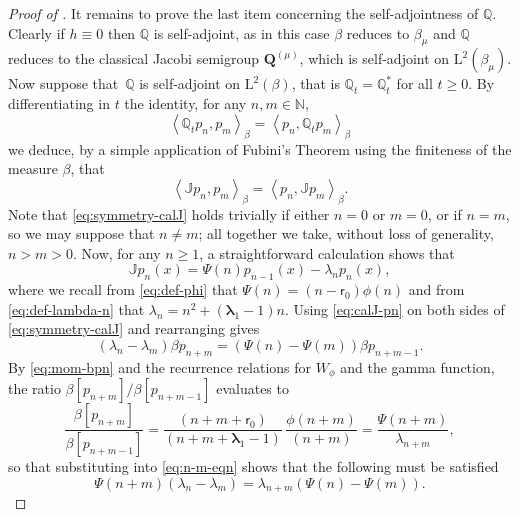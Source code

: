 \documentclass[10pt]{amsart}
\theoremstyle{plain}
\theoremstyle{definition}
\newcommand{\N}{\mathbb{N}}
\newcommand{\J}{\mathds{Q}}
\newcommand{\calJ}{\mathds{J}}
\newcommand{\Leb}{\mathrm{L}}
\newcommand{\lam}{{\bm{\lambda}_1}}
\newcommand{\tet}{{\mathsf{r}_0}}
\newcommand{\Q}[1][\mo]{\mathbf{Q}^{({#1})}}
\newcommand{\gab}[1][\lam,\mo]{{\beta_{#1}}}
\let\mo\mu
\let\bpsi\beta
\begin{document}
\begin{proof}[Proof of ]
It remains to prove the last item concerning the self-adjointness of $\J$. Clearly if $h \equiv 0$ then $\J$ is self-adjoint, as in this case $\bpsi$ reduces to $\gab[\mo]$ and $\J$ reduces to the classical Jacobi semigroup $\Q[\mo]$, which is self-adjoint on $\Leb^2(\gab[\mo])$. Now suppose that~$\J$ is self-adjoint on $\Leb^2(\bpsi)$, that is $\J_t = \J_t^*$ for all $t \geq 0$. By differentiating in $t$ the identity, for any $n, m \in \N$,
\begin{equation*}
\left\langle \J_t p_n, p_m \right\rangle_{\bpsi} = \left\langle p_n, \J_t p_m \right\rangle_{\bpsi}
\end{equation*}
we deduce, by a simple application of Fubini's Theorem using the finiteness of the measure $\bpsi$, that
\begin{equation}
\label{eq:symmetry-calJ}
\left\langle \calJ p_n, p_m \right\rangle_{\bpsi} = \left\langle p_n, \calJ p_m \right\rangle_{\bpsi}.
\end{equation}
Note that \eqref{eq:symmetry-calJ} holds trivially if either $n=0$ or $m=0$, or if $n=m$, so we may suppose that $n \neq m$; all together we take, without loss of generality, $n > m > 0$. Now, for any $n \geq 1$, a straightforward calculation shows that
\begin{equation}
\label{eq:calJ-pn}
\calJ p_n(x) = \Psi(n)p_{n-1}(x)-\lambda_n p_n(x),
\end{equation}
where we recall from \eqref{eq:def-phi} that $\Psi(n) = (n-\tet)\phi(n)$ and from \eqref{eq:def-lambda-n} that $\lambda_n = n^2+(\lam-1)n$. Using \eqref{eq:calJ-pn} on both sides of \eqref{eq:symmetry-calJ} and rearranging gives
\begin{equation}
\label{eq:n-m-eqn}
\left(\lambda_n-\lambda_m\right) \bpsi p_{n+m} = \left(\Psi(n)-\Psi(m)\right) \bpsi p_{n+m-1}.
\end{equation}
By \eqref{eq:mom-bpn} and the recurrence relations for $W_\phi$ and the gamma function, the ratio $\bpsi [p_{n+m}] / \bpsi [p_{n+m-1}]$ evaluates to
\begin{equation*}
\frac{\bpsi [p_{n+m}]}{\bpsi [p_{n+m-1}]} = \frac{(n+m+\tet)}{(n+m+\lam-1)}\,\frac{\phi(n+m)}{(n+m)} = \frac{\Psi(n+m)}{\lambda_{n+m}},
\end{equation*}
so that substituting into \eqref{eq:n-m-eqn} shows that the following must be satisfied
\begin{equation}
\label{eq:Psi-n-m}
\Psi(n+m)\left(\lambda_n-\lambda_m\right) = \lambda_{n+m}\left(\Psi(n)-\Psi(m)\right).
\end{equation}

\end{proof}
\end{document}
